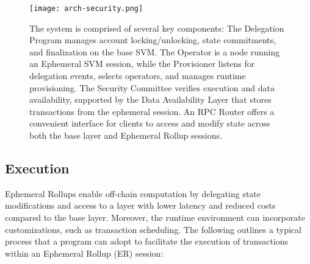 \documentclass{article}
\begin{document}
\begin{figure*}[t!]
    \texttt{[image: arch-security.png]}
    \caption{The system is comprised of several key components: The Delegation Program manages account locking/unlocking, state commitments, and finalization on the base SVM. The Operator is a node running an Ephemeral SVM session, while the Provisioner listens for delegation events, selects operators, and manages runtime provisioning. The Security Committee verifies execution and data availability, supported by the Data Availability Layer that stores transactions from the ephemeral session. An RPC Router offers a convenient interface for clients to access and modify state across both the base layer and Ephemeral Rollup sessions.}
    \label{fig1:arch}
\end{figure*}

\subsection{Execution}
\label{s:execution-and-fp}

Ephemeral Rollups enable off-chain computation by delegating state modifications and access to a layer with lower latency and reduced costs compared to the base layer. Moreover, the runtime environment can incorporate customizations, such as transaction scheduling. The following outlines a typical process that a program can adopt to facilitate the execution of transactions within an Ephemeral Rollup (ER) session: 
\end{document}

